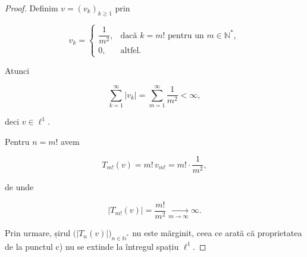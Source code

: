 \documentclass[12pt]{article}
\theoremstyle{definition}
\theoremstyle{plain}
\begin{document}
\begin{proof}
Definim $v = (v_k)_{k\ge 1}$ prin





\[
v_k =
\begin{cases}
\dfrac{1}{m^2}, & \text{dacă } k = m! \text{ pentru un } m \in \mathbb{N}^\ast,  \\[20pt]
0, & \text{altfel}.
\end{cases}
\]






Atunci


\[
\sum_{k=1}^\infty |v_k|
= \sum_{m=1}^\infty \frac{1}{m^2} < \infty,
\]


deci $v \in \ell^1$.

Pentru $n = m!$ avem


\[
T_{m!}(v) = m! \, v_{m!} = m! \cdot \frac{1}{m^2},
\]


de unde


\[
|T_{m!}(v)| = \frac{m!}{m^2} \xrightarrow[m\to\infty]{} \infty.
\]



Prin urmare, șirul $\bigl(|T_n(v)|\bigr)_{n\in\mathbb{N}^\ast}$ nu este mărginit, ceea ce arată că proprietatea de la punctul c) nu se extinde la întregul spațiu $\ell^1$.
\end{proof}
\end{document}
